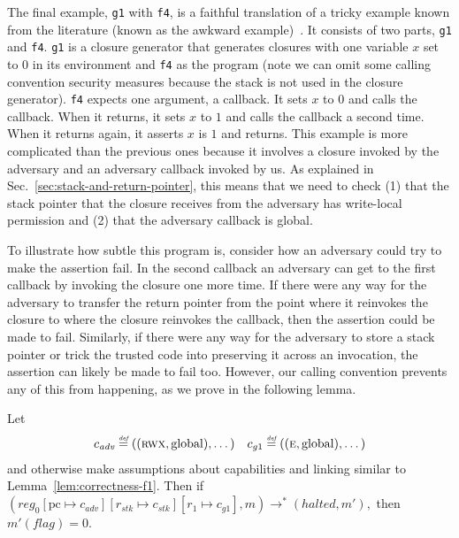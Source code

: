 \documentclass{llncs}
\newcommand{\sectionname}{Sec.}
\newcommand{\update}[2]{[#1 \mapsto #2]}
\newcommand{\defeq}{\stackrel{\textit{\tiny{def}}}{=}}
\newcommand{\var}[1]{\mathit{#1}}
\newcommand{\pcreg}{\mathrm{pc}}
\newcommand{\reg}{\var{reg}}
\newcommand{\adv}{\var{adv}}
\newcommand{\stk}{\var{stk}}
\newcommand{\flag}{\var{flag}}
\newcommand{\halted}{\mathit{halted}}
\newcommand{\plainperm}[1]{\textsc{#1}}
\newcommand{\entry}{\plainperm{e}}
\newcommand{\rwx}{\plainperm{rwx}}
\newcommand{\plainlocality}[1]{\mathrm{#1}}
\newcommand{\glob}{\plainlocality{global}}
\newcommand{\step}[1][]{\rightarrow_{#1}}
\begin{document}
The final example, \texttt{\footnotesize{g1}} with \texttt{\footnotesize{f4}},
is a faithful translation of a tricky example known from the literature (known
as the awkward example)~\cite{pitts_operational_1998,Dreyer:jfp12}. It consists
of two parts, \texttt{\footnotesize{g1}} and \texttt{\footnotesize{f4}}.
\texttt{\footnotesize{g1}} is a closure generator that generates closures with
one variable $x$ set to $0$ in its environment and \texttt{\footnotesize{f4}} as
the program (note we can omit some calling convention security measures because
the stack is not used in the closure generator). \texttt{\footnotesize{f4}}
expects one argument, a callback. It sets $x$ to $0$ and calls the callback.
When it returns, it sets $x$ to $1$ and calls the callback a second time. When
it returns again, it asserts $x$ is $1$ and returns. This example is more
complicated than the previous ones because it involves a closure invoked by the
adversary and an adversary callback invoked by us. As explained in
\sectionname~\ref{sec:stack-and-return-pointer}, this means that we need to check (1)
that the stack pointer that the closure receives from the adversary has
write-local permission and (2) that the adversary callback is global.

To illustrate how subtle this program is, consider how an adversary could try to
make the assertion fail. In the second callback an adversary can get to the
first callback by invoking the closure one more time. If there were any way for
the adversary to transfer the return pointer from the point where it reinvokes
the closure to where the closure reinvokes the callback, then the assertion
could be made to fail. Similarly, if there were any way for the adversary to
store a stack pointer or trick the trusted code into preserving it across an
invocation, the assertion can likely be made to fail too. However, our calling
convention prevents any of this from happening, as we prove in the following
lemma.

\begin{lemma}
  \label{lem:correctness-g1}
  Let
\[
    \begin{array}{r@{}lr@{}l}
    c_{\var{adv}} & \;\defeq ((\rwx,\glob),\dots) & c_{g1} & \;\defeq ((\entry,\glob),\dots)
    \end{array}
\]
  and otherwise make assumptions about capabilities and linking similar to Lemma~\ref{lem:correctness-f1}.
  Then if $
  (\reg_0\update{\pcreg}{c_\adv}\update{r_\stk}{c_\stk}\update{r_1}{c_{g1}},m) \step^* (\halted,m'),$
  then $m'(\flag) = 0$.
\end{lemma}
\end{document}
